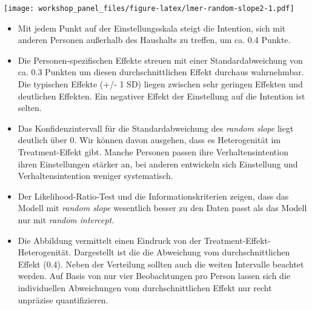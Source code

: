 \documentclass[
]{book}
\newenvironment{Shaded}{\begin{snugshade}}{\end{snugshade}}
\newcommand{\CommentTok}[1]{\textcolor[rgb]{0.56,0.35,0.01}{\textit{#1}}}
\newcommand{\DataTypeTok}[1]{\textcolor[rgb]{0.13,0.29,0.53}{#1}}
\newcommand{\DecValTok}[1]{\textcolor[rgb]{0.00,0.00,0.81}{#1}}
\newcommand{\FloatTok}[1]{\textcolor[rgb]{0.00,0.00,0.81}{#1}}
\newcommand{\KeywordTok}[1]{\textcolor[rgb]{0.13,0.29,0.53}{\textbf{#1}}}
\newcommand{\NormalTok}[1]{#1}
\newcommand{\OperatorTok}[1]{\textcolor[rgb]{0.81,0.36,0.00}{\textbf{#1}}}
\newcommand{\StringTok}[1]{\textcolor[rgb]{0.31,0.60,0.02}{#1}}
\begin{document}
\begin{Shaded}
\end{Shaded}

\texttt{[image: workshop\_panel\_files/figure-latex/lmer-random-slope2-1.pdf]}

\begin{itemize}
\item
  Mit jedem Punkt auf der Einstellungsskala steigt die Intention, sich mit anderen Personen außerhalb des Haushalts zu treffen, um ca. 0.4 Punkte.
\item
  Die Personen-spezifischen Effekte streuen mit einer Standardabweichung von ca. 0.3 Punkten um diesen durchschnittlichen Effekt durchaus wahrnehmbar. Die typischen Effekte (+/- 1 SD) liegen zwischen sehr geringen Effekten und deutlichen Effekten. Ein negativer Effekt der Einstellung auf die Intention ist selten.
\item
  Das Konfidenzintervall für die Standardabweichung des \emph{random slope} liegt deutlich über 0. Wir können davon ausgehen, dass es Heterogenität im Treatment-Effekt gibt. Manche Personen passen ihre Verhaltensintention ihren Einstellungen stärker an, bei anderen entwickeln sich Einstellung und Verhaltensintention weniger systematisch.
\item
  Der Likelihood-Ratio-Test und die Informationskriterien zeigen, dass das Modell mit \emph{random slope} wesentlich besser zu den Daten passt als das Modell nur mit \emph{random intercept}.
\item
  Die Abbildung vermittelt einen Eindruck von der Treatment-Effekt-Heterogenität. Dargestellt ist die die Abweichung vom durchschnittlichen Effekt (0.4). Neben der Verteilung sollten auch die weiten Intervalle beachtet werden. Auf Basis von nur vier Beobachtungen pro Person lassen sich die individuellen Abweichungen vom durchschnittlichen Effekt nur recht unpräzise quantifizieren.
\end{itemize}
\end{document}
